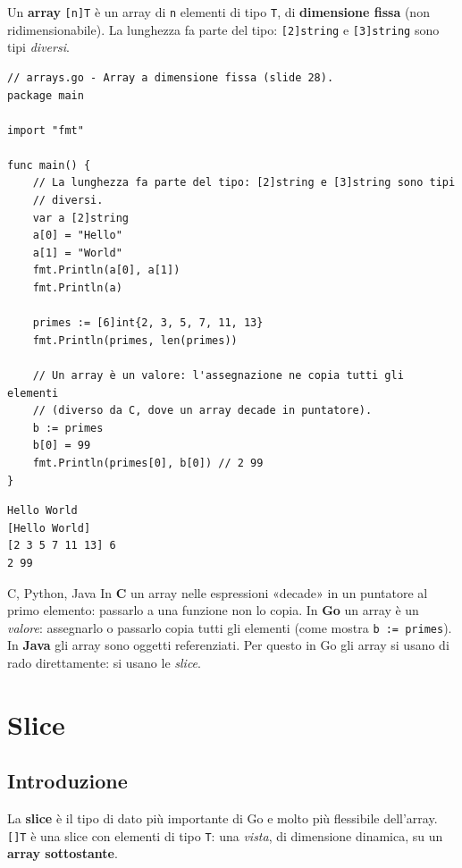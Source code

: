 \documentclass[11pt,a4paper]{report}
\newcommand{\cod}[1]{\texttt{#1}}
\begin{document}
Un \textbf{array} \cod{[n]T} è un array di \cod{n} elementi di tipo \cod{T}, di
\textbf{dimensione fissa} (non ridimensionabile). La lunghezza fa parte del tipo:
\cod{[2]string} e \cod{[3]string} sono tipi \emph{diversi}.

\begin{lstlisting}[style=gocode,caption={\texttt{04\_data\_structures/arrays.go}}]
// arrays.go - Array a dimensione fissa (slide 28).
package main

import "fmt"

func main() {
	// La lunghezza fa parte del tipo: [2]string e [3]string sono tipi
	// diversi.
	var a [2]string
	a[0] = "Hello"
	a[1] = "World"
	fmt.Println(a[0], a[1])
	fmt.Println(a)

	primes := [6]int{2, 3, 5, 7, 11, 13}
	fmt.Println(primes, len(primes))

	// Un array è un valore: l'assegnazione ne copia tutti gli elementi
	// (diverso da C, dove un array decade in puntatore).
	b := primes
	b[0] = 99
	fmt.Println(primes[0], b[0]) // 2 99
}
\end{lstlisting}
\begin{lstlisting}[style=output]
Hello World
[Hello World]
[2 3 5 7 11 13] 6
2 99
\end{lstlisting}

\begin{confronto}{C, Python, Java}
In \textbf{C} un array nelle espressioni «decade» in un puntatore al primo
elemento: passarlo a una funzione non lo copia. In \textbf{Go} un array è un
\emph{valore}: assegnarlo o passarlo copia tutti gli elementi (come mostra
\cod{b := primes}). In \textbf{Java} gli array sono oggetti referenziati.
Per questo in Go gli array si usano di rado direttamente: si usano le
\emph{slice}.
\end{confronto}

\section{Slice}\label{sec:slice}

\subsection{Introduzione}

La \textbf{slice} è il tipo di dato più importante di Go e molto più flessibile
dell'array. \cod{[]T} è una slice con elementi di tipo \cod{T}: una \emph{vista},
di dimensione dinamica, su un \textbf{array sottostante}.
\end{document}
